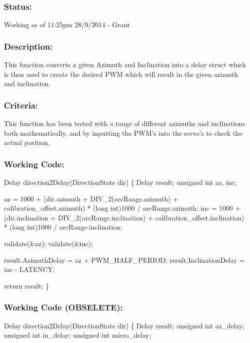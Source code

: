\documentclass[]{article}
\begin{document}
\subsubsection{Status:}
Working as of 11:25pm 28/9/2014 - Grant

\subsubsection{Description:}
This function converts a given Azimuth and Inclination into a delay struct which is then used to create the desired PWM which will result in the given azimuth and inclination.

\subsubsection{Criteria:}
This function has been tested with a range of different azimuths and inclinations both mathematically, and by inputting the PWM's into the servo's to check the actual position.

\subsubsection{Working Code:}
Delay direction2Delay(DirectionState dir) \newline
\{\newline
	Delay result; \newline
	unsigned int az, inc; \newline
	
	az = 1000 + (dir.azimuth + DIV\_2(arcRange.azimuth) + calibration\_offset.azimuth) * (long int)1000 / arcRange.azimuth; \newline
	inc = 1000 + (dir.inclination + DIV\_2(arcRange.inclination) + calibration\_offset.inclination) * (long int)1000 / arcRange.inclination;  \newline
	
	validate(\&az); \newline
	validate(\&inc); \newline
	
	result.AzimuthDelay = az + PWM\_HALF\_PERIOD; \newline
	result.InclinationDelay = inc - LATENCY; \newline
	
	return result; \newline
\} \newline

\subsubsection{Working Code (OBSELETE):}
Delay direction2Delay(DirectionState dir) \newline
\{\newline
	Delay result;\newline
	unsigned int az\_delay;\newline
	unsigned int in\_delay;\newline
	unsigned int micro\_delay;\newline
	
\end{document}
